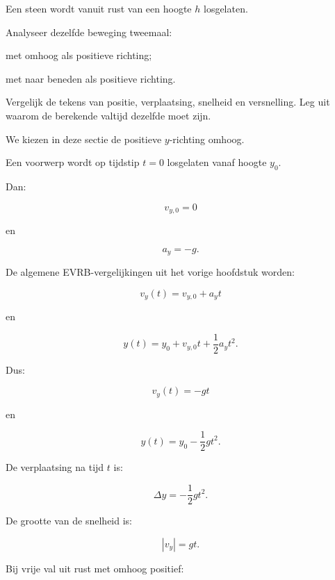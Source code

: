 \documentclass{ximera}
\begin{document}
\begin{oefening}{\oefU}

Een steen wordt vanuit rust van een hoogte $h$ losgelaten.

Analyseer dezelfde beweging tweemaal:

\begin{question}
met omhoog als positieve richting;
\end{question}

\begin{question}
met naar beneden als positieve richting.
\end{question}

Vergelijk de tekens van positie, verplaatsing, snelheid en versnelling.
Leg uit waarom de berekende valtijd dezelfde moet zijn.

\end{oefening}




We kiezen in deze sectie de positieve $y$-richting omhoog.

Een voorwerp wordt op tijdstip $t=0$ losgelaten vanaf hoogte $y_0$.

Dan:

\[
v_{y,0}=0
\]

en

\[
a_y=-g.
\]

De algemene EVRB-vergelijkingen uit het vorige hoofdstuk worden:

\[
v_y(t)=v_{y,0}+a_yt
\]

en

\[
y(t)=y_0+v_{y,0}t+\frac12a_yt^2.
\]

Dus:

\[
\boxed{
v_y(t)=-gt
}
\]

en

\[
\boxed{
y(t)=y_0-\frac12gt^2.
}
\]

De verplaatsing na tijd $t$ is:

\[
\boxed{
\Delta y=-\frac12gt^2.
}
\]

De grootte van de snelheid is:

\[
\boxed{
|v_y|=gt.
}
\]



Bij vrije val uit rust met omhoog positief:
\end{document}
